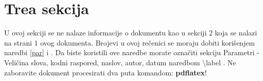 \documentclass[12pt,a4paper]{article}
\begin{document}
\section{Trea sekcija}

U ovoj sekciji se ne nalaze informacije o dokumentu kao u sekciji 2 koja
se nalazi na strani 1 ovog dokumenta. Brojevi u ovoj re\v{c}enici se moraju dobiti kori\v{s}enjem naredbi \ref{par} i \pageref{par} .
Da biste koristili ove naredbe morate označiti sekciju Parametri - Veli\v{c}ina slova, kodni raspored, naslov, autor, datum naredbom \textbackslash label .
\tiny{Ne zaboravite dokument procesirati dva puta komandom: \textbf{pdflatex}!}

\tableofcontents 











 
\end{document}

